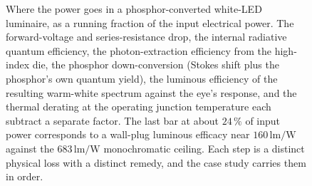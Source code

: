 \begin{figure}[htbp]
\caption[White-LED luminaire efficiency waterfall]{Where the power goes in a
phosphor-converted white-LED luminaire, as a running fraction of the input
electrical power. The forward-voltage and series-resistance drop, the internal
radiative quantum efficiency, the photon-extraction efficiency from the
high-index die, the phosphor down-conversion (Stokes shift plus the
phosphor's own quantum yield), the luminous efficiency of the resulting
warm-white spectrum against the eye's response, and the thermal derating at the
operating junction temperature each subtract a separate factor. The last bar at
about $24\,\%$ of input power corresponds to a wall-plug luminous efficacy near
$160\,\si{\lumen\per\watt}$ against the $683\,\si{\lumen\per\watt}$ monochromatic
ceiling. Each step is a distinct physical loss with a distinct remedy, and the
case study carries them in order.}
\label{fig:vol04ch12:led-efficiency-waterfall}
\end{figure}

